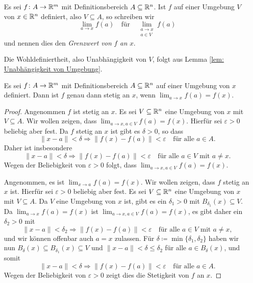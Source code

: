 \documentclass[a4paper,10pt]{article}
\begin{document}
\begin{defi}
 Es sei $f \colon A \to \mathbb{R}^m$ mit Definitionsbereich $A \subseteq \mathbb{R}^n$. Ist $f$ auf einer Umgebung $V$ von $x \in \mathbb{R}^n$ definiert, also $V \subseteq A$, so schreiben wir
 \[
  \lim_{a \to x} f(a)
  \quad
  \text{für}
  \quad
  \lim_{\substack{a \to x \\ a \in V}} f(a)
 \]
 und nennen dies den \emph{Grenzwert von $f$ an $x$}.
\end{defi}


Die Wohldefiniertheit, also Unabhängigkeit von $V$, folgt aus Lemma \ref{lem: Unabhängigkeit von Umgebung}.


\begin{prop}\label{prop: Stetigkeit durch Funktionsgrenzwerte}
 Es sei $f \colon A \to \mathbb{R}^m$ mit Definitionsbereich $A \subseteq \mathbb{R}^n$ auf einer Umgebung von $x$ definiert. Dann ist $f$ genau dann stetig an $x$, wenn \mbox{$\lim_{a \to x} f(a) = f(x)$}.
\end{prop}
\begin{proof}
 Angenommen $f$ ist stetig an $x$. Es sei $V \subseteq \mathbb{R}^n$ eine Umgebung von $x$ mit $V \subseteq A$. Wir wollen zeigen, dass $\lim_{a \to x, a \in V} f(a) = f(x)$. Hierfür sei $\varepsilon > 0$ beliebig aber fest. Da $f$ stetig an $x$ ist gibt es $\delta > 0$, so dass
 \[
  \|x-a\| < \delta \Rightarrow \|f(x)-f(a)\| < \varepsilon
  \quad \text{für alle $a \in A$}.
 \]
 Daher ist insbesondere
 \[
  \|x-a\| < \delta \Rightarrow \|f(x)-f(a)\| < \varepsilon
  \quad \text{für alle $a \in V$ mit $a \neq x$}.
 \]
 Wegen der Beliebigkeit von $\varepsilon > 0$ folgt, dass $\lim_{a \to x, a \in V} f(a) = f(x)$.
 
 Angenommen, es ist $\lim_{x \to a} f(a) = f(x)$. Wir wollen zeigen, dass $f$ stetig an $x$ ist. Hierfür sei $\varepsilon > 0$ beliebig aber fest. Es sei $V \subseteq \mathbb{R}^n$ eine Umgebung von $x$ mit $V \subseteq A$. Da $V$ eine Umgebung von $x$ ist, gibt es ein $\delta_1 > 0$ mit $B_{\delta_1}(x) \subseteq V$. Da $\lim_{a \to x} f(a) = f(x)$ ist $\lim_{a \to x, a \in V} f(a) = f(x)$, es gibt daher ein $\delta_2 > 0$ mit
 \[
  \|x-a\| < \delta_2 \Rightarrow \|f(x)-f(a)\| < \varepsilon
  \quad \text{für alle $a \in V$ mit $a \neq x$},
 \]
 und wir können offenbar auch $a = x$ zulassen. Für $\delta \coloneqq \min\{\delta_1, \delta_2\}$ haben wir nun $B_\delta(x) \subseteq B_{\delta_1}(x) \subseteq V$ und $\|x-a\| < \delta \leq \delta_2$ für alle $a \in B_\delta(x)$, und somit
 \[
  \|x-a\| < \delta \Rightarrow \|f(x)-f(a)\| < \varepsilon
  \quad \text{für alle $a \in A$.}
 \]
 Wegen der Beliebigkeit von $\varepsilon > 0$ zeigt dies die Stetigkeit von $f$ an $x$.
\end{proof}
\end{document}
